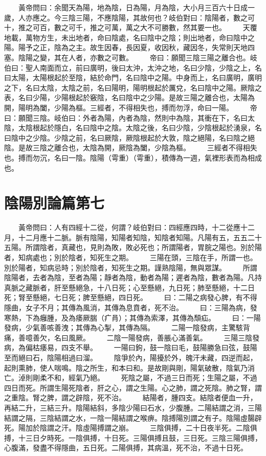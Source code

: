 　　黃帝問曰：余聞天為陽，地為陰，日為陽，月為陰，大小月三百六十日成一歲，人亦應之。今三陰三陽，不應陰陽，其故何也？岐伯對曰：陰陽者，數之可十，推之可百，數之可千，推之可萬，萬之大不可勝數，然其要一也。
　　天覆地載，萬物方生，未出地者，命曰陰處，名曰陰中之陰；則出地者，命曰陰中之陽。陽予之正，陰為之主。故生因春，長因夏，收因秋，藏因冬，失常則天地四塞。陰陽之變，其在人者，亦數之可數。
　　帝曰：願聞三陰三陽之離合也。岐伯曰：聖人南面而立，前曰廣明，後曰太沖，太沖之地，名曰少陰，少陰之上，名曰太陽，太陽根起於至陰，結於命門，名曰陰中之陽。中身而上，名曰廣明，廣明之下，名曰太陰，太陰之前，名曰陽明，陽明根起於厲兌，名曰陰中之陽。厥陰之表，名曰少陽，少陽根起於竅陰，名曰陰中之少陽。是故三陽之離合也，太陽為開，陽明為闔，少陽為樞。三經者，不得相失也，搏而勿浮，命曰一陽。
　　帝曰：願聞三陰。岐伯曰：外者為陽，內者為陰，然則中為陰，其衝在下，名曰太陰，太陰根起於隱白，名曰陰中之陰。太陰之後，名曰少陰，少陰根起於湧泉，名曰陰中之少陰。少陰之前，名曰厥陰，厥陰根起於大敦，陰之絕陽，名曰陰之絕陰。是故三陰之離合也，太陰為開，厥陰為闔，少陰為樞。
　　三經者不得相失也。搏而勿沉，名曰一陰。陰陽（雩重）（雩重），積傳為一週，氣裡形表而為相成也。


\section{陰陽別論篇第七}

　　黃帝問曰：人有四經十二從，何謂？岐伯對曰：四經應四時，十二從應十二月，十二月應十二脈。脈有陰陽，知陽者知陰，知陰者知陽。凡陽有五，五五二十五陽。所謂陰者，真藏也，見則為敗，敗必死也；所謂陽者，胃脘之陽也。別於陽者，知病處也；別於陰者，知死生之期。
　　三陽在頭，三陰在手，所謂一也。別於陽者，知病忌時；別於陰者，知死生之期。謹熟陰陽，無與眾謀。
　　所謂陰陽者，去者為陰，至者為陽；靜者為陰，動者為陽；遲者為陰，數者為陽。凡持真脈之藏脈者，肝至懸絕急，十八日死；心至懸絕，九日死；肺至懸絕，十二日死；腎至懸絕，七日死；脾至懸絕，四日死。
　　曰：二陽之病發心脾，有不得隱曲，女子不月；其傳為風消，其傳為息賁者，死不治。
　　曰：三陽為病，發寒熱，下為癰腫，及為痿厥腨（疒肙）；其傳為索澤，其傳為頹疝。
　　曰：一陽發病，少氣善咳善洩；其傳為心掣，其傳為隔。
　　二陽一陰發病，主驚駭背痛，善噫善欠，名曰風厥。
　　二陰一陽發病，善脹心滿善氣。
　　三陽三陰發病，為偏枯痿易，四支不舉。
　　一陽曰鉤，鼓一陰曰毛，鼓陽勝急曰弦，鼓陽至而絕曰石，陰陽相過曰溜。
　　陰爭於內，陽擾於外，魄汗未藏，四逆而起，起則熏肺，使人喘鳴。陰之所生，和本曰和。是故剛與剛，陽氣破散，陰氣乃消亡。淖則剛柔不和，經氣乃絕。
　　死陰之屬，不過三日而死；生陽之屬，不過四日而死。所謂生陽死陰者，肝之心，謂之生陽。心之肺，謂之死陰。肺之腎，謂之重陰。腎之脾，謂之辟陰，死不治。
　　結陽者，腫四支。結陰者便血一升，再結二升，三結三升。陰陽結斜，多陰少陽曰石水，少腹腫。二陽結謂之消，三陽結謂之隔，三陰結謂之水，一陰一陽結謂之喉痹。陰搏陽別謂之有子。陰陽虛腸辟死。陽加於陰謂之汗。陰虛陽搏謂之崩。
　　三陰俱搏，二十日夜半死。二陰俱搏，十三日夕時死。一陰俱搏，十日死。三陽俱搏且鼓，三日死。三陰三陽俱搏，心腹滿，發盡不得隱曲，五日死。二陽俱搏，其病溫，死不治，不過十日死。



